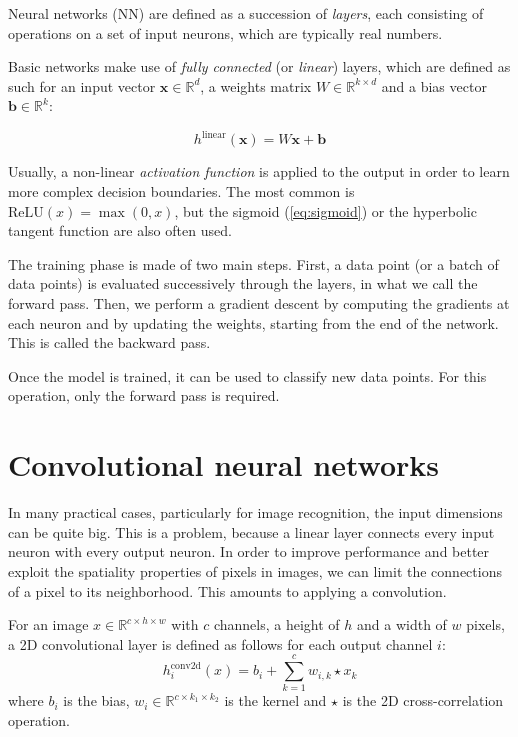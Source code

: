 \documentclass[a4paper,11pt,oneside]{report}
\begin{document}
Neural networks (NN) are defined as a succession of \emph{layers}, each consisting of operations on a set of input neurons, which are typically real numbers.

Basic networks make use of \emph{fully connected} (or \emph{linear}) layers, which are defined as such for an input vector $\mathbf{x} \in \mathbb{R}^d$, a weights matrix $W \in \mathbb{R}^{k \times d}$ and a bias vector $\mathbf{b} \in \mathbb{R}^k$:

\begin{equation}\label{eq:linear_layer}
    h^{\mathrm{linear}}(\mathbf{x}) = W \mathbf{x} + \mathbf{b}
\end{equation}

Usually, a non-linear \emph{activation function} is applied to the output in order to learn more complex decision boundaries. 
The most common is $\mathrm{ReLU}(x) = \max(0, x)$, but the sigmoid (\autoref{eq:sigmoid}) or the hyperbolic tangent function are also often used.

The training phase is made of two main steps. 
First, a data point (or a batch of data points) is evaluated successively through the layers, in what we call the forward pass. 
Then, we perform a gradient descent by computing the gradients at each neuron and by updating the weights, starting from the end of the network. 
This is called the backward pass.

Once the model is trained, it can be used to classify new data points. 
For this operation, only the forward pass is required.

\section{Convolutional neural networks}

In many practical cases, particularly for image recognition, the input dimensions can be quite big. 
This is a problem, because a linear layer connects every input neuron with every output neuron. 
In order to improve performance and better exploit the spatiality properties of pixels in images, we can limit the connections of a pixel to its neighborhood. 
This amounts to applying a convolution.

For an image $x \in \mathbb{R}^{c \times h \times w}$ with $c$ channels, a height of $h$ and a width of $w$ pixels, a 2D convolutional layer is defined as follows for each output channel $i$:
\begin{equation}\label{eq:conv2d_layer}
    h_i^{\mathrm{conv2d}}(x) = b_i + \sum_{k=1}^{c} w_{i, k} \star x_{k}
\end{equation}
where $b_i$ is the bias, $w_i \in \mathbb{R}^{c \times k_1 \times k_2}$ is the kernel and $\star$ is the 2D cross-correlation operation.
\end{document}
